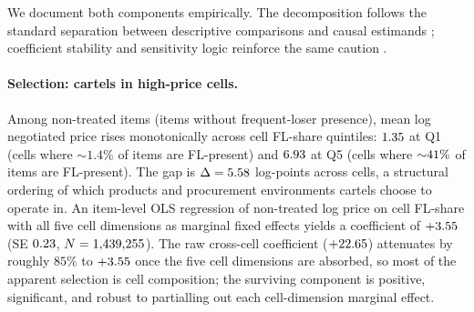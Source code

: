 We document both components empirically. The decomposition
follows the standard separation between descriptive comparisons
and causal estimands \citep{imbens2015causal}; coefficient
stability and sensitivity logic reinforce the same caution
\citep{oster2019unobservable,cinelli2020making}.

\paragraph{Selection: cartels in high-price cells.}
Among non-treated items (items without frequent-loser presence),
mean log negotiated price rises monotonically across cell
FL-share quintiles: $1.35$ at Q1 (cells where ${\sim}1.4\%$
of items are FL-present) and $6.93$ at Q5 (cells where
${\sim}41\%$ of items are FL-present). The gap is
$\Delta=5.58$ log-points across cells, a structural
ordering of which products and procurement environments cartels
choose to operate in. An item-level OLS regression of
non-treated log price on cell FL-share with all five cell
dimensions as marginal fixed effects yields a coefficient of
$+3.55$ (SE $0.23$, $N=1{,}439{,}255$).
The raw cross-cell coefficient ($+22.65$) attenuates
by roughly $85\%$ to $+3.55$ once the five cell
dimensions are absorbed, so most of the apparent selection is
cell composition; the surviving component is positive,
significant, and robust to partialling out each cell-dimension
marginal effect.

